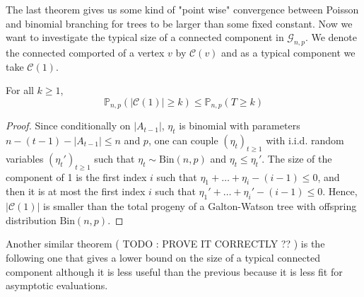 The last theorem gives us some kind of "point wise" convergence between Poisson and binomial branching for trees to be larger than some fixed constant.
\newline
Now we want to investigate the typical size of a connected component in $\mathcal{G}_{n,p}$. We denote the connected comported of a vertex $v$ by $\mathcal{C}(v)$ and as a typical component we take $\mathcal{C}(1)$.
\begin{theorem}
	For all $k\geq1$,
	\begin{equation}
		\mathbb{P}_{n,p}(|\mathcal{C}(1)| \geq k) \leq \mathbb{P}_{n,p}(T\geq k)
	\end{equation}
\end{theorem}
\begin{proof}
	Since conditionally on $|A_{t-1}|$, $\eta_t$ is binomial with parameters $n - (t-1) -|A_{t-1}| \leq n$ and $p$, 
	one can couple $(\eta_t)_{t \geq 1}$ with i.i.d. random variables $(\eta_t')_{t\geq 1}$ such that $\eta_t \sim \text{Bin}(n,p)$ and $\eta_t \leq \eta_t'$.
	\newline
	The size of the component of 1 is the first index $i$ such that $\eta_1 + \ldots + \eta_i - (i-1) \leq 0$, 
	and then it is at most the first index $i$ such that $\eta_1' + \ldots + \eta_i' - (i-1) \leq 0$.
	Hence, $|\mathcal{C}(1)|$ is smaller than the total progeny of a Galton-Watson tree with offspring distribution $\text{Bin}(n,p)$.
	\end{proof}
Another similar theorem ( TODO : PROVE IT CORRECTLY  ?? ) is the following one that gives a lower bound on the size of a typical connected component although it is less useful than the previous because it is less fit for asymptotic evaluations.

